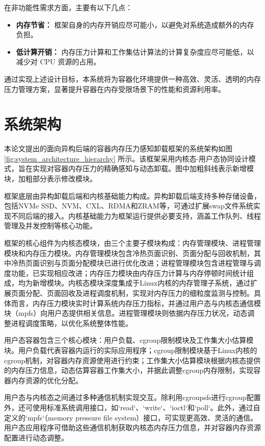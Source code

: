 在非功能性需求方面，主要有以下几点：

\begin{itemize}
    \item \textbf{内存节省：} 框架自身的内存开销应尽可能小，以避免对系统造成额外的内存负担。
    \item \textbf{低计算开销：} 内存压力计算和工作集估计算法的计算复杂度应尽可能低，以减少对 CPU 资源的占用。
\end{itemize}


通过实现上述设计目标，本系统将为容器化环境提供一种高效、灵活、透明的内存压力管理方案，显著提升容器在内存受限场景下的性能和资源利用率。

\section{系统架构}

本论文提出的面向异构后端的容器内存压力感知卸载框架的系统架构如图 \ref{fig:system_architecture_hierarchy} 所示。该框架采用内核态-用户态协同设计模式，旨在实现对容器内存压力的精确感知与动态卸载。图中加粗斜线表示新增模块，加粗部分表示修改模块。

框架底层由异构卸载后端和内核基础能力构成。异构卸载后端支持多种存储设备，包括NVMe SSD、NVM、CXL、RDMA和ZRAM等，可通过扩展swap文件系统实现不同后端的接入。内核基础能力为框架运行提供必要支持，涵盖工作队列、线程管理及并发控制等核心功能。

框架的核心组件为内核态模块，由三个主要子模块构成：内存管理模块、进程管理模块和内存压力模块。内存管理模块包含冷热页面识别、页面分配与回收机制，其中冷热页面识别与页面分配模块已进行优化改进；进程管理模块包含进程管理与调度功能，已实现相应改进；内存压力模块由内存压力计算与内存停顿时间统计组成，均为新增模块。内核态模块深度集成于Linux内核的内存管理子系统，通过扩展页面分配、页面回收及进程调度机制，实现对内存压力的细粒度监测与控制。具体而言，内存压力模块实时计算系统内存压力指标，并通过用户态与内核态通信模块（mpfs）向用户态提供相关信息。进程管理模块则依据内存压力状况，动态调整进程调度策略，以优化系统整体性能。

用户态容器包含三个核心模块：用户负载、cgroup限制模块及工作集大小估算模块。用户负载代表容器内运行的实际应用程序；cgroup限制模块基于Linux内核的cgroup机制，对容器内存资源使用进行约束；工作集大小估算模块根据内核态提供的内存压力信息，动态估算容器工作集大小，并据此调整cgroup内存限制，实现容器内存资源的优化分配。

用户态与内核态之间通过多种通信机制实现交互。除利用cgroupsfs进行cgroup配置外，还可使用标准系统调用接口，如`read`、`write`、`ioctl`和`poll`。此外，通过自定义的`mpfs`（memory pressure file system）接口，可实现更高效、灵活的通信。用户态应用程序可借助这些通信机制获取内核态内存压力信息，并对容器内存资源配置进行动态调整。

